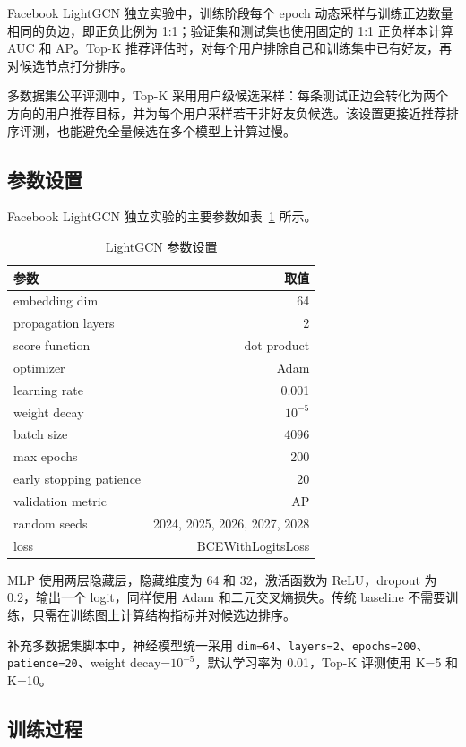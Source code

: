 \documentclass[UTF8,zihao=-4]{ctexart}
\begin{document}
Facebook LightGCN 独立实验中，训练阶段每个 epoch 动态采样与训练正边数量相同的负边，即正负比例为 1:1；验证集和测试集也使用固定的 1:1 正负样本计算 AUC 和 AP。Top-K 推荐评估时，对每个用户排除自己和训练集中已有好友，再对候选节点打分排序。

多数据集公平评测中，Top-K 采用用户级候选采样：每条测试正边会转化为两个方向的用户推荐目标，并为每个用户采样若干非好友负候选。该设置更接近推荐排序评测，也能避免全量候选在多个模型上计算过慢。

\subsection{参数设置}

Facebook LightGCN 独立实验的主要参数如表~\ref{tab:params} 所示。

\begin{table}[H]
\centering
\caption{LightGCN 参数设置}
\label{tab:params}
\begin{tabularx}{0.7\textwidth}{lr}
\toprule
参数 & 取值 \\
\midrule
embedding dim & 64 \\
propagation layers & 2 \\
score function & dot product \\
optimizer & Adam \\
learning rate & 0.001 \\
weight decay & \(10^{-5}\) \\
batch size & 4096 \\
max epochs & 200 \\
early stopping patience & 20 \\
validation metric & AP \\
random seeds & 2024, 2025, 2026, 2027, 2028 \\
loss & BCEWithLogitsLoss \\
\bottomrule
\end{tabularx}
\end{table}

MLP 使用两层隐藏层，隐藏维度为 64 和 32，激活函数为 ReLU，dropout 为 0.2，输出一个 logit，同样使用 Adam 和二元交叉熵损失。传统 baseline 不需要训练，只需在训练图上计算结构指标并对候选边排序。

补充多数据集脚本中，神经模型统一采用 \texttt{dim=64}、\texttt{layers=2}、\texttt{epochs=200}、\texttt{patience=20}、weight decay=\(10^{-5}\)，默认学习率为 0.01，Top-K 评测使用 K=5 和 K=10。

\subsection{训练过程}
\end{document}
